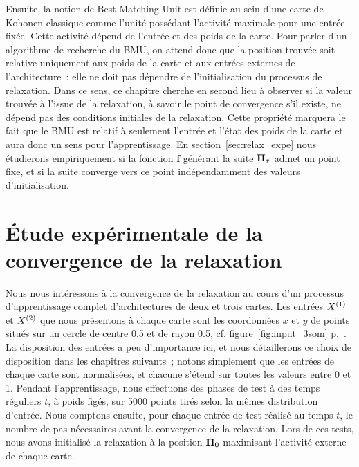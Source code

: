 \documentclass[../main]{subfiles}
\begin{document}
Ensuite, la notion de Best Matching Unit est définie au sein d'une carte de Kohonen classique comme l'unité possédant l'activité maximale pour une entrée fixée. Cette activité dépend de l'entrée et des poids de la carte.
Pour parler d'un algorithme de recherche du BMU, on attend donc que la position trouvée soit relative uniquement aux poids de la carte et aux entrées externes de l'architecture~: elle ne doit pas dépendre de l'initialisation du processus de relaxation.
Dans ce sens, ce chapitre cherche en second lieu à observer si la valeur trouvée à l'issue de la relaxation, à savoir le point de convergence s'il existe, ne dépend pas des conditions initiales de la relaxation.
Cette propriété marquera le fait que le BMU est relatif à seulement l'entrée et l'état des poids de la carte et aura donc un sens pour l'apprentissage.
En section~\ref{sec:relax_expe} nous étudierons empiriquement si la fonction $\mathbf{f}$ générant la suite $\mathbf{\Pi}_\tau$ admet un point fixe, et si la suite converge vers ce point indépendamment des valeurs d'initialisation.

\section{\'Etude expérimentale de la convergence de la relaxation}\label{sec:relax_conv}

Nous nous intéressons à la convergence de la relaxation au cours d'un processus d'apprentissage complet d'architectures de deux et trois cartes. 
Les entrées $X^{({1})}$ et $X^{({2})}$ que nous présentons à chaque carte sont les coordonnées $x$ et $y$ de points situés sur un cercle de centre 0.5 et de rayon 0.5, cf. figure~\ref{fig:input_3som} p.~\pageref{fig:input_3som}. La disposition des entrées a peu d'importance ici, et nous détaillerons ce choix de disposition dans les chapitres suivants~; notons simplement que les entrées de chaque carte sont normalisées, et chacune s'étend sur toutes les valeurs entre 0 et 1.
Pendant l'apprentissage, nous effectuons des phases de test à des temps réguliers $t$, à poids figés, sur 5000 points tirés selon la mêmes distribution d'entrée. 
Nous comptons ensuite, pour chaque entrée de test réalisé au temps $t$, le nombre de pas nécessaires avant la convergence de la relaxation. Lors de ces tests, nous avons initialisé la relaxation à la position $\mathbf{\Pi}_0$ maximisant l'activité externe de chaque carte.
\end{document}
